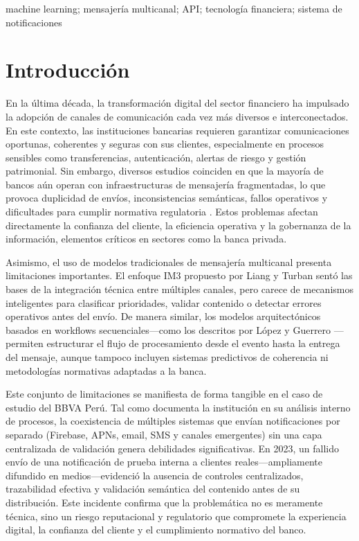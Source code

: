 \documentclass[conference]{IEEEtran}
\newenvironment{customkeywords}{
  \vspace{0.5em}
  \noindent{\emph{\textbf{Keywords -}}}\hspace{0.5em}\itshape
}{\par\vspace{1em}}
\begin{document}
\begin{customkeywords}
machine learning; mensajer{\'i}a multicanal; API; tecnolog{\'i}a financiera; sistema de notificaciones
\end{customkeywords}

\section{Introducción}

En la última década, la transformación digital del sector financiero ha impulsado la adopción de canales de comunicación cada vez más diversos e interconectados. En este contexto, las instituciones bancarias requieren garantizar comunicaciones oportunas, coherentes y seguras con sus clientes, especialmente en procesos sensibles como transferencias, autenticación, alertas de riesgo y gestión patrimonial. Sin embargo, diversos estudios coinciden en que la mayoría de bancos aún operan con infraestructuras de mensajería fragmentadas, lo que provoca duplicidad de envíos, inconsistencias semánticas, fallos operativos y dificultades para cumplir normativa regulatoria \cite{rahimi2021, alzahrani2020, torres2020}. Estos problemas afectan directamente la confianza del cliente, la eficiencia operativa y la gobernanza de la información, elementos críticos en sectores como la banca privada.

Asimismo, el uso de modelos tradicionales de mensajería multicanal presenta limitaciones importantes. El enfoque IM3 propuesto por Liang y Turban \cite{liang2011} sentó las bases de la integración técnica entre múltiples canales, pero carece de mecanismos inteligentes para clasificar prioridades, validar contenido o detectar errores operativos antes del envío. De manera similar, los modelos arquitectónicos basados en workflows secuenciales—como los descritos por López y Guerrero \cite{lopez2020}—permiten estructurar el flujo de procesamiento desde el evento hasta la entrega del mensaje, aunque tampoco incluyen sistemas predictivos de coherencia ni metodologías normativas adaptadas a la banca.

Este conjunto de limitaciones se manifiesta de forma tangible en el caso de estudio del BBVA Perú. Tal como documenta la institución en su análisis interno de procesos, la coexistencia de múltiples sistemas que envían notificaciones por separado (Firebase, APNs, email, SMS y canales emergentes) sin una capa centralizada de validación genera debilidades significativas. En 2023, un fallido envío de una notificación de prueba interna a clientes reales—ampliamente difundido en medios—evidenció la ausencia de controles centralizados, trazabilidad efectiva y validación semántica del contenido antes de su distribución. Este incidente confirma que la problemática no es meramente técnica, sino un riesgo reputacional y regulatorio que compromete la experiencia digital, la confianza del cliente y el cumplimiento normativo del banco.
\end{document}
